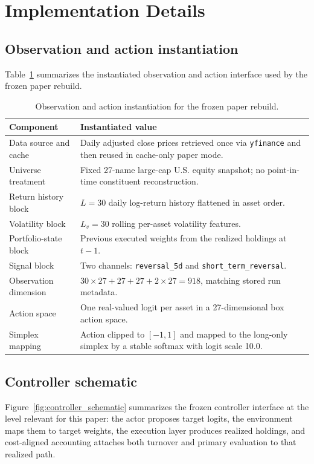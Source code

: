 \documentclass[10pt,twocolumn]{article}
\begin{document}
\section{Implementation Details}
\label{app:implementation_details}
\subsection{Observation and action instantiation}
Table~\ref{tab:impl_obs_action} summarizes the instantiated observation and action interface used by the frozen paper rebuild.

\begin{table}[H]
\centering
\small
\caption{Observation and action instantiation for the frozen paper rebuild.}
\label{tab:impl_obs_action}
\begin{tabular}{@{}p{}p{}@{}}
\toprule
Component & Instantiated value \\
\midrule
Data source and cache & Daily adjusted close prices retrieved once via \texttt{yfinance} and then reused in cache-only paper mode. \\
Universe treatment & Fixed 27-name large-cap U.S. equity snapshot; no point-in-time constituent reconstruction. \\
Return history block & $L=30$ daily log-return history flattened in asset order. \\
Volatility block & $L_v=30$ rolling per-asset volatility features. \\
Portfolio-state block & Previous executed weights from the realized holdings at $t-1$. \\
Signal block & Two channels: \texttt{reversal\_5d} and \texttt{short\_term\_reversal}. \\
Observation dimension & $30\times27 + 27 + 27 + 2\times27 = 918$, matching stored run metadata. \\
Action space & One real-valued logit per asset in a 27-dimensional box action space. \\
Simplex mapping & Action clipped to $[-1,1]$ and mapped to the long-only simplex by a stable softmax with logit scale 10.0. \\
\bottomrule
\end{tabular}
\end{table}

\subsection{Controller schematic}
Figure~\ref{fig:controller_schematic} summarizes the frozen controller interface at the level relevant for this paper: the actor proposes target logits, the environment maps them to target weights, the execution layer produces realized holdings, and cost-aligned accounting attaches both turnover and primary evaluation to that realized path.
\end{document}
